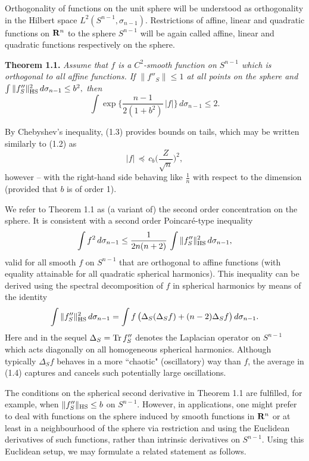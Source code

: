 \documentclass[reqno,12pt]{amsart}
\theoremstyle{plain}
\begin{document}
Orthogonality of functions on the unit sphere will be understood as 
orthogonality in the Hilbert space $L^2(S^{n-1},\sigma_{n-1})$. 
Restrictions of affine, linear and quadratic functions on ${{\bf R}}^n$ to the
sphere $S^{n-1}$ will be again called affine, 
linear and quadratic functions respectively on the sphere.

\vskip5mm
{\bf Theorem 1.1.} {\it Assume that $f$ is a $C^2$-smooth function on 
$S^{n-1}$ which is orthogonal to all affine functions. If $\|f''_S\| \leq 1$ 
at all points on the sphere and 
$
\int \|f''_S\|_{{\rm HS}}^2\,d\sigma_{n-1} \leq b^2,
$ 
then 
\begin{equation}
\int \exp\Big\{\frac{n-1}{2(1+b^2)}\, |f|\Big\}\,d\sigma_{n-1} \leq 2.
\end{equation}
}

\vskip2mm
By Chebyshev's inequality, (1.3) provides bounds on tails,
which may be written similarly to (1.2) as
$$
|f| \, \preceq \, c_b\Big(\frac{Z}{\sqrt{n}}\Big)^2,
$$
however -- with the right-hand side behaving like $\frac{1}{n}$ 
with respect to the dimension (provided that $b$ is of order 1). 

We refer to Theorem 1.1 as (a variant of) the second order concentration
on the sphere. It is consistent with a second order Poincar\'e-type 
inequality
$$
\int f^2\,d\sigma_{n-1} \leq \frac{1}{2n(n+2)}\,
\int \|f''_S\|_{{\rm HS}}^2\,d\sigma_{n-1},
$$
valid for all smooth $f$ on $S^{n-1}$ that are orthogonal 
to affine functions (with equality attainable for all quadratic
spherical harmonics). This inequality can be derived using the spectral
decomposition of $f$ in spherical harmonics by means of the identity
\begin{equation}
\int \|f''_S\|_{{\rm HS}}^2\,d\sigma_{n-1} = 
\int f\, \big(\Delta_S (\Delta_S f) + (n-2)\Delta_S f\big)\,d\sigma_{n-1}.
\end{equation}
Here and in the sequel $\Delta_S = {\rm Tr}\, f''_S$ denotes the Laplacian 
operator on $S^{n-1}$ which acts diagonally on all homogeneous spherical
harmonics. Although typically $\Delta_S f$ behaves in a more ``chaotic" 
(oscillatory) way than $f$, the average in (1.4) captures and cancels 
such potentially large oscillations.

The conditions on the spherical second derivative in Theorem 1.1 are 
fulfilled, for example, when $\|f''_S\|_{{\rm HS}} \leq b$ on $S^{n-1}$.
However, in applications, one might prefer to deal with functions on the
sphere induced by smooth functions in ${{\bf R}}^n$ or at least in 
a neighbourhood of the sphere via restriction and using the Euclidean 
derivatives of such functions, rather than intrinsic derivatives on $S^{n-1}$. 
Using this Euclidean setup, we may formulate a related statement as follows. 
\end{document}
